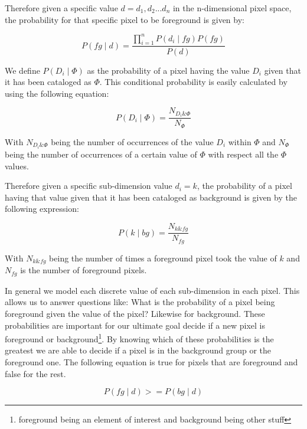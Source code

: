 \documentclass[a4paper,12pt]{report}
\begin{document}
Therefore given a specific value $d={d_1,d_2...d_n}$ in the n-dimensional
pixel space, the probability for that specific pixel to be foreground is
given by:

\begin{equation}
P(fg \mid d) = \frac{\prod_{i=1}^n{P(d_i \mid fg)} P(fg)}{P(d)}
\end{equation}

We define $P(D_i \mid \Phi)$ as the probability of a pixel having the value $D_i$
given that it has been cataloged as $\Phi$. This conditional probability is
easily calculated by using the following equation:

\begin{equation}\label{eq:dimgivenphi}
P(D_i \mid \Phi) = \frac{N_{D_i\&\Phi}}{N_{\Phi}}
\end{equation}

With $N_{D_i\&\Phi}$ being the number of occurrences of the value $D_i$ within
$\Phi$ and $N_{\Phi}$ being the number of occurrences of a certain value of
$\Phi$ with respect all the $\Phi$ values.

Therefore given a specific sub-dimension value $d_i=k$, the probability of a
pixel having that value given that it has been cataloged as background is given
by the following expression:

\begin{equation}
P(k \mid bg) = \frac{N_{k\&fg}}{N_{fg}}
\end{equation}

With $N_{k\&fg}$ being the number of times a foreground pixel took the value of
$k$ and $N_{fg}$ is the number of foreground pixels.

In general we model each discrete value of each sub-dimension in
each pixel. This allows us to answer questions like: What is the probability of
a pixel being foreground given the value of the pixel? Likewise for background.
These probabilities are important for our ultimate goal decide if a new pixel
is foreground or background\footnote{foreground being an element of interest
and background being other stuff}. By knowing which of these probabilities is
the greatest we are able to decide if a pixel is in the background group or the
foreground one. The following equation is true for pixels that are foreground
and false for the rest.

\begin{equation}\label{eq:comparison}
P(fg \mid d) >= P(bg \mid d)
\end{equation}
\end{document}
